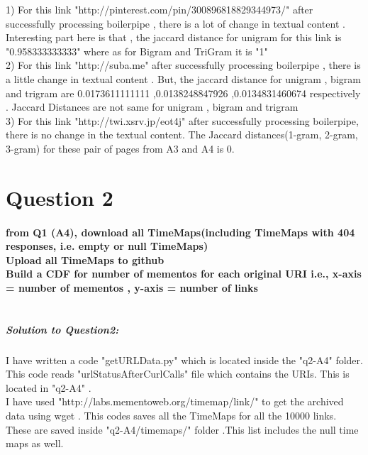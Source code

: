 \documentclass[12pt]{Report}
\begin{document}
1) For this link "http://pinterest.com/pin/300896818829344973/" after successfully processing boilerpipe , there is a lot of change in textual content . Interesting part here is that , the jaccard distance for unigram for this link is "0.958333333333" where as for Bigram and TriGram it is "1"\\


2) For this link "http://suba.me" after successfully processing boilerpipe , there is a little change in textual content . But, the jaccard distance for unigram , bigram and trigram are 0.0173611111111 ,0.0138248847926  ,0.0134831460674 respectively . Jaccard Distances are not same for unigram , bigram and trigram \\


3) For this link "http://twi.xsrv.jp/eot4j" after successfully processing boilerpipe, there is no change in the textual content. The Jaccard distances(1-gram, 2-gram, 3-gram) for these pair of pages from A3  and A4 is 0.\\
 




\section{Question 2\\}

\paragraph{from Q1 (A4), download all TimeMaps(including TimeMaps with 404 responses, i.e. empty or null TimeMaps) \\ Upload all TimeMaps to github\\ Build a CDF for number of mementos for each original URI i.e., x-axis = number of mementos , y-axis = number of links \\\\ }

\subparagraph{Solution to Question2: \\}
I have written a code "getURLData.py" which is located inside the "q2-A4" folder. This code reads "urlStatusAfterCurlCalls" file which contains the URIs. This is located in "q2-A4" .\\ I have used  "http://labs.mementoweb.org/timemap/link/" to get the archived data using wget . This codes saves all the TimeMaps for all the 10000 links. These are saved inside "q2-A4/timemaps/" folder .This list includes the null time maps as well.\\
\end{document}
